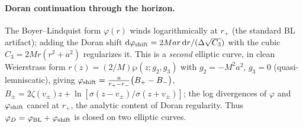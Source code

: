 \documentclass[
    aps, prd, twocolumn, superscriptaddress,
    showpacs, nofootinbib, floatfix
]{revtex4-2}
\newcommand{\rp}{r_{+}}
\newcommand{\dd}{\mathrm{d}}
\begin{document}
\paragraph{Doran continuation through the horizon.} The Boyer--Lindquist form
$\varphi(r)$ winds logarithmically at $\rp$ (the standard BL artifact); adding the
Doran shift $\dd\varphi_{\rm shift}=2Mar\,\dd r/(\Delta\sqrt{C_3})$ with the cubic
$C_3=2Mr(r^2+a^2)$ regularizes it. This is a \emph{second} elliptic curve, in
clean Weierstrass form $r(z)=(2/M)\wp(z;g_2,g_3)$ with $g_2=-M^2a^2$, $g_3=0$
(quasi-lemniscatic), giving
$\varphi_{\rm shift}=\tfrac{a}{r_+-r_-}\big(B_+-B_-\big)$,
$B_\pm=2\zeta(v_\pm)z+\ln[\sigma(z-v_\pm)/\sigma(z+v_\pm)]$; the log divergences of
$\varphi$ and $\varphi_{\rm shift}$ cancel at $\rp$, the analytic content of Doran
regularity. Thus $\varphi_D=\varphi_{\rm BL}+\varphi_{\rm shift}$ is closed on two
elliptic curves.
\end{document}
